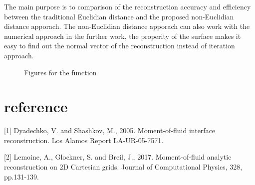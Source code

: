 \documentclass{article}
\begin{document}
The main purpose is to comparison of the reconstruction accuracy and efficiency between the traditional Euclidian distance and the proposed non-Euclidian distance apporach. 
The non-Euclidian distance apporach can also work with the numerical approach in the further work, 
the properity of the surface makes it easy to find out the normal vector of the reconstruction instead of iteration approach.


\begin{figure}[h]
\centering


\caption{Figures for the function }

\end{figure}

\section*{reference}

[1] Dyadechko, V. and Shashkov, M., 2005. Moment-of-fluid interface reconstruction. Los Alamos Report LA-UR-05-7571.

[2] Lemoine, A., Glockner, S. and Breil, J., 2017. Moment-of-fluid analytic reconstruction on 2D Cartesian grids. Journal of Computational Physics, 328, pp.131-139.
\end{document}
